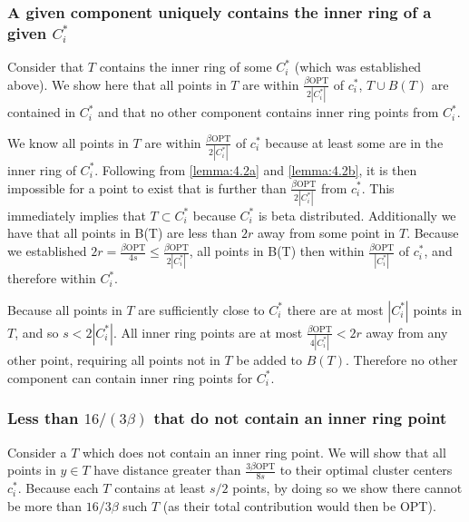 \documentclass[paper=a4, fontsize=10.5pt]{scrartcl} %
\numberwithin{equation}{section} %
\numberwithin{figure}{section} %
\numberwithin{table}{section} %
\begin{document}
\subsubsection{A given component uniquely contains the inner ring of a given $C^*_i$}

Consider that $T$ contains the inner ring of some $C^*_i$ (which was established above). We show here that all points in $T$ are within $\frac{\beta\text{OPT}}{2|C^*_i|}$ of $c_i^*$, $T \cup B(T)$ are contained in $C_i^*$ and that no other component contains inner ring points from $C^*_i$.

We know all points in $T$ are within $\frac{\beta\text{OPT}}{2|C^*_i|}$ of $c_i^*$ because at least some are in the inner ring of $C^*_i$. Following from \ref{lemma:4.2a} and \ref{lemma:4.2b}, it is then impossible for a point to exist that is further than $\frac{\beta\text{OPT}}{2|C^*_i|}$ from $c_i^*$. This immediately implies that $T \subset C_i^*$ because $C_i^*$ is beta distributed. Additionally we have that all points in B(T) are less than $2r$ away from some point in $T$. Because we established $2r = \frac{\beta\text{OPT}}{4s} \leq \frac{\beta\text{OPT}}{2|C_i^*|}$, all points in B(T) then within $ \frac{\beta\text{OPT}}{|C_i^*|}$ of $c_i^*$, and therefore within $C_i^*$. 

Because all points in $T$ are sufficiently close to $C_i^*$ there are at most $|C_i^*|$ points in $T$, and so $s < 2|C_i^*|$. All inner ring points are at most $\frac{\beta\text{OPT}}{4|C^*_i|} < 2r$ away from any other point, requiring all points not in $T$ be added to $B(T)$. Therefore no other component can contain inner ring points for $C_i^*$.


\subsubsection{Less than $16/(3\beta)$ that do not contain an inner ring point}

Consider a $T$ which does not contain an inner ring point. We will show that all points in $y \in T$ have distance greater than $\frac{3\beta\text{OPT}}{8s}$ to their optimal cluster centers $c_i^*$. Because each $T$ contains at least $s/2$ points, by doing so we show there cannot be more than $16/3\beta$ such $T$ (as their total contribution would then be OPT).
\end{document}

